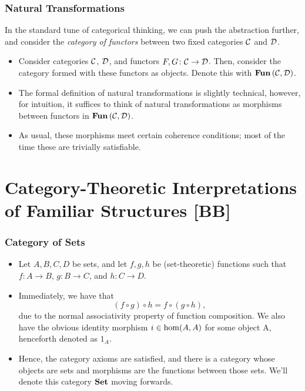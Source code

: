 \documentclass{beamer}
\numberwithin{figure}{section}
\begin{document}
\begin{frame}
        \frametitle{Natural Transformations}
        In the standard tune of categorical thinking, we can push the
        abstraction further, and consider the \emph{category of functors}
        between two fixed categories $\mathcal{C}$ and $\mathcal{D}$.
        \pause
        \begin{itemize}
                \item Consider categories $\mathcal{C}$, $\mathcal{D}$, and
                        functors $F, G \colon \mathcal{C} \to \mathcal{D}$. Then,
                        consider the category formed with these functors as
                        objects. Denote this with
                        $\operatorname{\text{\textbf{Fun}}}{(\mathcal{C},\mathcal{D})}$.
                \item The formal definition of natural transformations is
                        slightly technical, however, for intuition, it suffices
                        to think of natural transformations as morphisms between
                        functors in $\operatorname{\text{\textbf{Fun}}}{(\mathcal{C},\mathcal{D})}$.
                \item As usual, these morphisms meet certain coherence
                        conditions; most of the time these are trivially
                        satisfiable.
        \end{itemize}
\end{frame}

\section{Category-Theoretic Interpretations of Familiar Structures [BB]}
\begin{frame}
        \frametitle{Category of Sets}
        \begin{itemize}
                \item Let $A,B,C,D$ be sets, and let $f,g,h$ be (set-theoretic)
                        functions such that $f \colon A \to B$, $g \colon B \to
                        C$, and $h \colon C \to D$.
                \item Immediately, we have that
                        \begin{equation*}
                                \left( f \circ g \right) \circ h = f \circ
                                \left( g \circ h \right),
                        \end{equation*}
                        due to the normal associativity property of function
                        composition. We also have the obvious identity morphism
                        $i \in \operatorname{hom}(A,A)$ for some object A, henceforth
                        denoted as $1_A$.
                \item Hence, the category axioms are satisfied, and there is a
                        category whose objects are sets and morphisms are the
                        functions between those sets. We'll denote this category
                        $\operatorname{\text{\textbf{Set}}}$ moving forwards.
        \end{itemize}
\end{frame}
\end{document}
